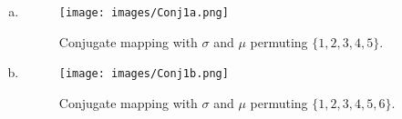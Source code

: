 \begin{enumerate}[(a)]
\item
\begin{figure}[H]
\begin{center}
\texttt{[image: images/Conj1a.png]}
\caption{Conjugate mapping with $\sigma$ and $\mu$ permuting $\{1,2,3,4,5\}$.}
\end{center}
\end{figure}

\item
\begin{figure}[H]
\begin{center}
\texttt{[image: images/Conj1b.png]}
\caption{Conjugate mapping with $\sigma$ and $\mu$ permuting $\{1,2,3,4,5,6\}$.}
\end{center}
\end{figure}
\end{enumerate}

